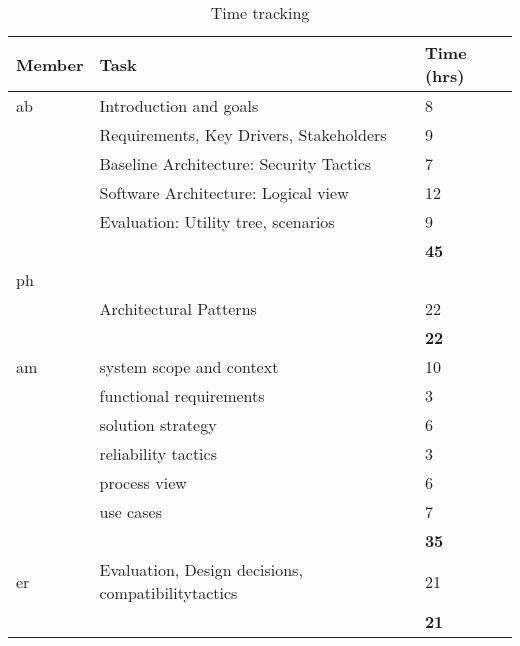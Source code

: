 
\begin{table}[H]
	\centering
	\begin{tabularx}{\textwidth}{p{2cm}|X|p{2.5cm}}
		\textbf{Member} & \textbf{Task} & \textbf{Time (hrs)} \\
		\hline
		ab &Introduction and goals                  & 8 \\
		   &Requirements, Key Drivers, Stakeholders & 9  \\
		   &Baseline Architecture: Security Tactics & 7  \\
		   &Software Architecture: Logical view     &12   \\
		   &Evaluation: Utility tree, scenarios     & 9  \\

		& & \textbf{45} \\
		\hline
		ph &  &  \\
			& Architectural Patterns & 22 \\
		& & \textbf{22} \\
		\hline
		am & system scope and context & 10 \\
		 & functional requirements & 3 \\
		 & solution strategy & 6 \\
		 & reliability tactics & 3 \\
		 & process view & 6 \\
		 & use cases & 7 \\
		& & \textbf{35} \\
		\hline
		er & Evaluation, Design decisions, compatibilitytactics & 21 \\
		& & \textbf{21} \\
		\hline
	\end{tabularx}
	\caption{Time tracking}
	\label{tab:timetracking-1}
\end{table}
